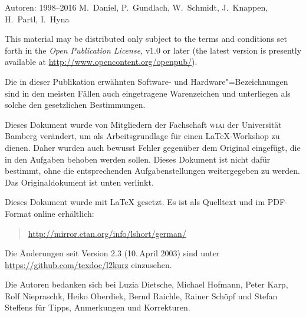 {\parindent=0cm\thispagestyle{empty}

Autoren: 1998--2016 M.~Daniel, P.~Gundlach, W.~Schmidt, J.~Knappen, H.~Partl, I.~Hyna

\bigskip

{
This material may be distributed only subject to the terms and
conditions set forth in the \emph{Open Publication License}, v1.0 or
later (the latest version is presently available at
\url{http://www.opencontent.org/openpub/}).}


\bigskip

Die in dieser Publikation erwähnten Software- und Hardware"=Bezeichnungen sind
in den meisten Fällen auch eingetragene Warenzeichen und unterliegen als
solche den gesetzlichen Bestimmungen.

\bigskip

Dieses Dokument wurde von Mitgliedern der Fachschaft \textsc{wiai} der Universität Bamberg verändert, um als Arbeitsgrundlage für einen \LaTeX{}-Workshop zu dienen. Daher wurden auch bewusst Fehler gegenüber dem Original eingefügt, die in den Aufgaben behoben werden sollen. Dieses Dokument ist nicht dafür bestimmt, ohne die entsprechenden Aufgabenstellungen weitergegeben zu werden. Das Originaldokument ist unten verlinkt.

\vfill

Dieses Dokument wurde mit \LaTeX{} gesetzt.
Es ist als Quelltext und im PDF-Format online erhältlich:
\begin{quote}
\url{http://mirror.ctan.org/info/lshort/german/}
\end{quote}
Die Änderungen seit Version 2.3 (10.\,April 2003) sind unter \url{https://github.com/texdoc/l2kurz} einzusehen.
\bigskip

Die Autoren bedanken sich bei
Luzia Dietsche,
Michael Hofmann,
Peter Karp,
Rolf \mbox{Niepraschk},
Heiko Oberdiek,
Bernd Raichle,
Rainer Schöpf und
Stefan Steffens
für Tipps, Anmerkungen und  Korrekturen.

}
